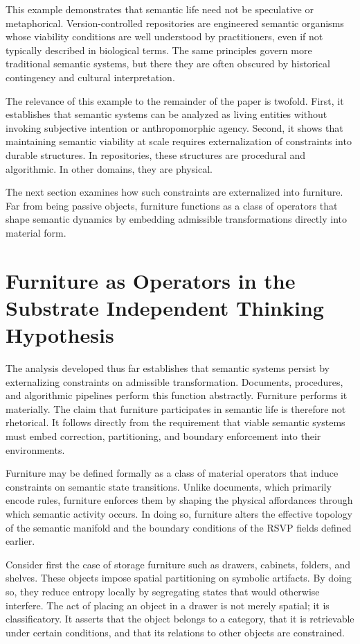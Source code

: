 \documentclass[11pt,oneside]{article}
\begin{document}
This example demonstrates that semantic life need not be speculative or metaphorical. Version-controlled repositories are engineered semantic organisms whose viability conditions are well understood by practitioners, even if not typically described in biological terms. The same principles govern more traditional semantic systems, but there they are often obscured by historical contingency and cultural interpretation.

The relevance of this example to the remainder of the paper is twofold. First, it establishes that semantic systems can be analyzed as living entities without invoking subjective intention or anthropomorphic agency. Second, it shows that maintaining semantic viability at scale requires externalization of constraints into durable structures. In repositories, these structures are procedural and algorithmic. In other domains, they are physical.

The next section examines how such constraints are externalized into furniture. Far from being passive objects, furniture functions as a class of operators that shape semantic dynamics by embedding admissible transformations directly into material form.

\section{Furniture as Operators in the Substrate Independent Thinking Hypothesis}

The analysis developed thus far establishes that semantic systems persist by externalizing constraints on admissible transformation. Documents, procedures, and algorithmic pipelines perform this function abstractly. Furniture performs it materially. The claim that furniture participates in semantic life is therefore not rhetorical. It follows directly from the requirement that viable semantic systems must embed correction, partitioning, and boundary enforcement into their environments.

Furniture may be defined formally as a class of material operators that induce constraints on semantic state transitions. Unlike documents, which primarily encode rules, furniture enforces them by shaping the physical affordances through which semantic activity occurs. In doing so, furniture alters the effective topology of the semantic manifold and the boundary conditions of the RSVP fields defined earlier.

Consider first the case of storage furniture such as drawers, cabinets, folders, and shelves. These objects impose spatial partitioning on symbolic artifacts. By doing so, they reduce entropy locally by segregating states that would otherwise interfere. The act of placing an object in a drawer is not merely spatial; it is classificatory. It asserts that the object belongs to a category, that it is retrievable under certain conditions, and that its relations to other objects are constrained.
\end{document}
